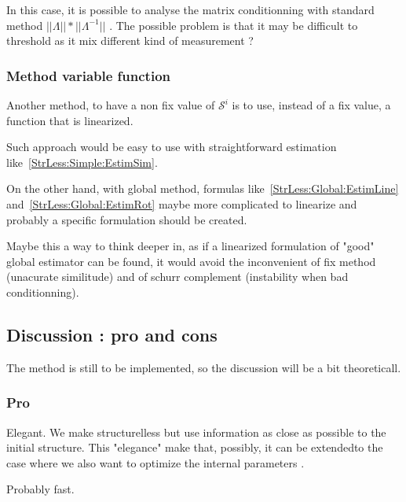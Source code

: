 In this case, it is possible to analyse the matrix conditionning with
standard method $||\Lambda|| * ||\Lambda ^{-1}||$ . The possible problem
is that it may be difficult to threshold as it mix different kind of measurement ?


\subsubsection{Method variable function}

Another method, to have a non fix value of $\mathcal{S}^i$  is 
to use, instead of a fix value, a function that is linearized.

Such approach would be easy to use with straightforward estimation 
like~\ref{StrLess:Simple:EstimSim}.

On the other hand, with global method, formulas like~\ref{StrLess:Global:EstimLine}
and~\ref{StrLess:Global:EstimRot} maybe more complicated to linearize and probably
a specific formulation should be created.

Maybe this a way to think deeper in, as if a linearized formulation of "good" global
estimator can be found, it would avoid the inconvenient of fix method (unacurate similitude)
and of schurr complement (instability when bad conditionning).



\subsection{Discussion : pro and cons}

The method is still to be implemented, so the discussion will be a bit theoreticall.


\subsubsection{Pro}

Elegant.  We make structurelless but use information as close as possible to the initial structure.
This "elegance" make that, possibly, it can be extendedto the case where we also want to
optimize the internal parameters .

Probably fast.

